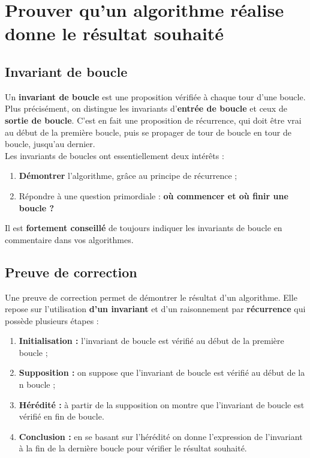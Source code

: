 \section{Prouver qu'un algorithme réalise donne le résultat souhaité}

\subsection{Invariant de boucle}

\begin{defi}
Un \textbf{invariant de boucle} est une proposition vérifiée à chaque tour d'une boucle. Plus 
précisément, on distingue les invariants d'\textbf{entrée de boucle} et ceux de \textbf{sortie de 
boucle}. C'est en fait une proposition de récurrence, qui doit être vrai au début de la première 
boucle, puis se propager de tour de boucle en tour de boucle, jusqu'au dernier.\\
Les invariants de boucles ont essentiellement deux intérêts :
\begin{enumerate}
 \item \textbf{Démontrer} l'algorithme, grâce au principe de récurrence ;
 \item Répondre à une question primordiale : \textbf{où commencer et où finir une boucle ?}
\end{enumerate}
\end{defi}

\begin{rem}
Il est \textbf{fortement conseillé} de toujours indiquer les invariants de boucle en commentaire 
dans vos algorithmes.\\ 
\end{rem}



\subsection{Preuve de correction}

\begin{defi}
Une preuve de correction permet de démontrer le résultat d'un algorithme. Elle repose sur l'utilisation \textbf{d'un invariant} et d'un raisonnement par \textbf{récurrence} qui possède plusieurs étapes : 
\begin{enumerate}
\item \textbf{Initialisation : } l'invariant de boucle est vérifié au début de la première boucle ;
\item \textbf{Supposition : } on suppose que l'invariant de boucle est vérifié au début de la n boucle ;
\item \textbf{Hérédité : } à partir de la supposition on montre que l'invariant de boucle est vérifié en fin de boucle.
\item \textbf{Conclusion : } en se basant sur l'hérédité on donne l'expression de l'invariant à la fin de la dernière boucle pour vérifier le résultat souhaité.
\end{enumerate}

\end{defi}

